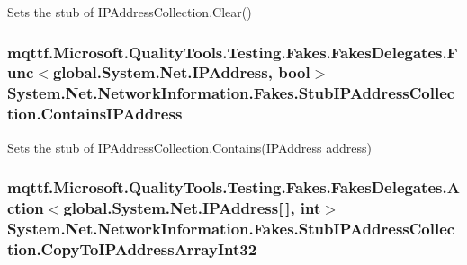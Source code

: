 Sets the stub of I\-P\-Address\-Collection.\-Clear()

\hypertarget{class_system_1_1_net_1_1_network_information_1_1_fakes_1_1_stub_i_p_address_collection_a4ec3e2b5ab82c0290cf2fceb6b1b5b1a}{
\subsubsection[{Contains\-I\-P\-Address}]{\setlength{\rightskip}{0pt plus 5cm}mqttf.\-Microsoft.\-Quality\-Tools.\-Testing.\-Fakes.\-Fakes\-Delegates.\-Func$<$global.\-System.\-Net.\-I\-P\-Address, bool$>$ System.\-Net.\-Network\-Information.\-Fakes.\-Stub\-I\-P\-Address\-Collection.\-Contains\-I\-P\-Address}}\label{class_system_1_1_net_1_1_network_information_1_1_fakes_1_1_stub_i_p_address_collection_a4ec3e2b5ab82c0290cf2fceb6b1b5b1a}


Sets the stub of I\-P\-Address\-Collection.\-Contains(\-I\-P\-Address address)

\hypertarget{class_system_1_1_net_1_1_network_information_1_1_fakes_1_1_stub_i_p_address_collection_add5138194b020beb62b3b0c127946680}{
\subsubsection[{Copy\-To\-I\-P\-Address\-Array\-Int32}]{\setlength{\rightskip}{0pt plus 5cm}mqttf.\-Microsoft.\-Quality\-Tools.\-Testing.\-Fakes.\-Fakes\-Delegates.\-Action$<$global.\-System.\-Net.\-I\-P\-Address\mbox{[}$\,$\mbox{]}, int$>$ System.\-Net.\-Network\-Information.\-Fakes.\-Stub\-I\-P\-Address\-Collection.\-Copy\-To\-I\-P\-Address\-Array\-Int32}}\label{class_system_1_1_net_1_1_network_information_1_1_fakes_1_1_stub_i_p_address_collection_add5138194b020beb62b3b0c127946680}


